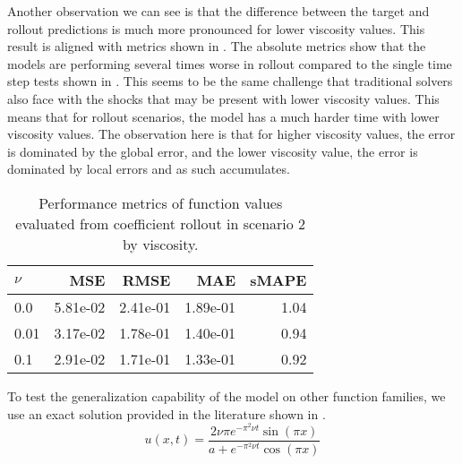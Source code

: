 \documentclass[preprint,12pt,times,authoryear]{elsarticle}
\begin{document}
Another observation we can see is that the difference between the target and rollout predictions is much more pronounced for lower viscosity values. This result is aligned with metrics shown in . The absolute metrics show that the models are performing several times worse in rollout compared to the single time step tests shown in . This seems to be the same challenge that traditional solvers also face with the shocks that may be present with lower viscosity values. This means that for rollout scenarios, the model has a much harder time with lower viscosity values. The observation here is that for higher viscosity values, the error is dominated by the global error, and the lower viscosity value, the error is dominated by local errors and as such accumulates.
\begin{table}[H]
  \caption{Performance metrics of function values evaluated from coefficient rollout in scenario 2 by viscosity.}\label{table:scenario_2_rollout_function_metrics}
  \centering
  \begin{tabular}{lrrrr}
    \toprule
    \(\nu \) & MSE      & RMSE     & MAE      & sMAPE \\
    \midrule
    0.0      & 5.81e-02 & 2.41e-01 & 1.89e-01 & 1.04  \\
    0.01     & 3.17e-02 & 1.78e-01 & 1.40e-01 & 0.94  \\
    0.1      & 2.91e-02 & 1.71e-01 & 1.33e-01 & 0.92  \\
    \bottomrule
  \end{tabular}
\end{table}

To test the generalization capability of the model on other function families, we use an exact solution provided in the literature shown in  \citep{woodExactSolutionBurgers2006,wazwazPartialDifferentialEquations2010,bentonTableSolutionsOnedimensional1972}.
\begin{equation}
  u(x,t) = \frac{2\nu\pi e^{-\pi^2\nu t}\sin(\pi x)}{a+e^{-\pi^2\nu t}\cos(\pi x)} \label{eq:burgers_exact_solution}
\end{equation}
\end{document}
